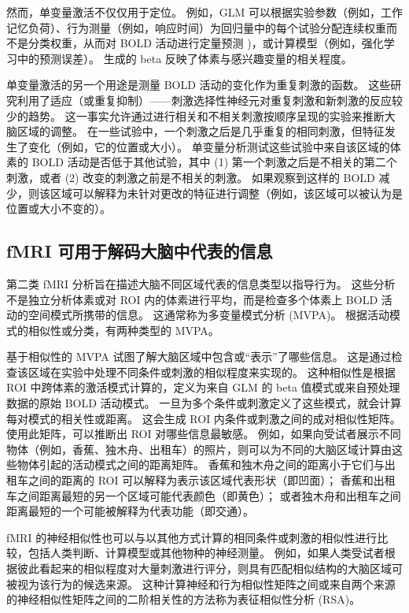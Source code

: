 然而，单变量激活不仅仅用于定位。 
例如，GLM 可以根据实验参数（例如，工作记忆负荷）、行为测量（例如，响应时间）为回归量中的每个试验分配连续权重而不是分类权重，从而对 BOLD 活动进行定量预测 )，或计算模型（例如，强化学习中的预测误差）。 
生成的 beta 反映了体素与感兴趣变量的相关程度。


单变量激活的另一个用途是测量 BOLD 活动的变化作为重复刺激的函数。 
这些研究利用了适应（或重复抑制）——刺激选择性神经元对重复刺激和新刺激的反应较少的趋势。 
这一事实允许通过进行相关和不相关刺激按顺序呈现的实验来推断大脑区域的调整。
在一些试验中，一个刺激之后是几乎重复的相同刺激，但特征发生了变化（例如，它的位置或大小）。 
单变量分析测试这些试验中来自该区域的体素的 BOLD 活动是否低于其他试验，其中 (1) 第一个刺激之后是不相关的第二个刺激，或者 (2) 改变的刺激之前是不相关的刺激。
如果观察到这样的 BOLD 减少，则该区域可以解释为未针对更改的特征进行调整（例如，该区域可以被认为是位置或大小不变的）。


\subsection{fMRI 可用于解码大脑中代表的信息}
第二类 fMRI 分析旨在描述大脑不同区域代表的信息类型以指导行为。 
这些分析不是独立分析体素或对 ROI 内的体素进行平均，而是检查多个体素上 BOLD 活动的空间模式所携带的信息。 
这通常称为多变量模式分析 (MVPA)。 
根据活动模式的相似性或分类，有两种类型的 MVPA。


基于相似性的 MVPA 试图了解大脑区域中包含或“表示”了哪些信息。 
这是通过检查该区域在实验中处理不同条件或刺激的相似程度来实现的。 
这种相似性是根据 ROI 中跨体素的激活模式计算的，定义为来自 GLM 的 beta 值模式或来自预处理数据的原始 BOLD 活动模式。 
一旦为多个条件或刺激定义了这些模式，就会计算每对模式的相关性或距离。 
这会生成 ROI 内条件或刺激之间的成对相似性矩阵。 
使用此矩阵，可以推断出 ROI 对哪些信息最敏感。 
例如，如果向受试者展示不同物体（例如，香蕉、独木舟、出租车）的照片，则可以为不同的大脑区域计算由这些物体引起的活动模式之间的距离矩阵。 
香蕉和独木舟之间的距离小于它们与出租车之间的距离的 ROI 可以解释为表示该区域代表形状（即凹面）； 
香蕉和出租车之间距离最短的另一个区域可能代表颜色（即黄色）； 
或者独木舟和出租车之间距离最短的一个可能被解释为代表功能（即交通）。


fMRI 的神经相似性也可以与以其他方式计算的相同条件或刺激的相似性进行比较，包括人类判断、计算模型或其他物种的神经测量。 
例如，如果人类受试者根据彼此看起来的相似程度对大量刺激进行评分，则具有匹配相似结构的大脑区域可被视为该行为的候选来源。 
这种计算神经和行为相似性矩阵之间或来自两个来源的神经相似性矩阵之间的二阶相关性的方法称为表征相似性分析 (RSA)。


